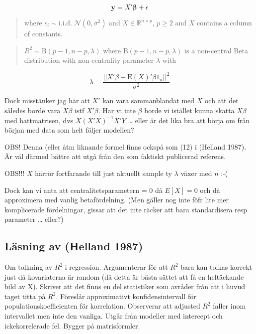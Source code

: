 \documentclass[]{article}
\begin{document}
\[\pmb{y}=X'\pmb{\beta}+\epsilon\]

\begin{quote}
where \(\epsilon_i\sim\mathrm{i.i.d.}\;\mathcal{N}(0,\sigma^2)\) and
\(X\in\mathbb{R}^{n\times p}\), \(p\geq2\) and \(X\) contains a column
of constants.
\end{quote}

\begin{quote}
\(R^2\sim\mathrm{B}(p-1,n-p,\lambda)\) where
\(\mathrm{B}(p-1,n-p,\lambda)\) is a non-central Beta distribution with
non-centrality parameter \(\lambda\) with
\end{quote}

\[\lambda=\frac{||X'\beta-\mathrm{E}(X)'\beta1_n||^2}{\sigma^2}\]

Dock misstänker jag här att \(X'\) kan vara sammanblandat med \(X\) och
att det således borde vara \(X \beta\) istf \(X' \beta\). Har vi inte
\(\beta\) borde vi istället kunna skatta \(X\beta\) med hattmatrisen,
dvs \(X(X'X)^{-1}X'Y\) \ldots{} eller är det lika bra att börja om från
början med data som helt följer modellen?

OBS! Denna (eller åtm liknande formel finns ockspå som (12) i (Helland
1987). Är väl därmed bättre att utgå från den som faktiskt publicerad
referens.

OBS!!! \(X\) härrör fortfarande till just aktuellt sample ty \(\lambda\)
växer med \(n\) :-(

Dock kan vi anta att centralitetsparametern = 0 då \(E[X] = 0\) och då
approximera med vanlig betafördelning. (Men gäller nog inte föfr lite
mer komplicerade fördelningar, gissar att det inte räcker att bara
standardisera resp parameter \ldots{} eller?)

\subsection{Läsning av (Helland 1987)}\label{lasning-av-helland1987}

Om tolkning av \(R^2\) i regression. Argumenterar för att \(R^2\) bara
kan tolkas korrekt just då kovariaterna är random (då detta är bästa
sättet att få en heltäckande bild av X). Skriver att det finns en del
statistiker som avråder från att i huvud taget titta på \(R^2\).
Föreslår approximativt konfidensintervall för populationskoefficienten
för korrelation. Observerar att adjusted \(R^2\) faller inom intervallet
men inte den vanliga. Utgår från modeller med intercept och
ickekorrelerade fel. Bygger på matrisformler.
\end{document}

